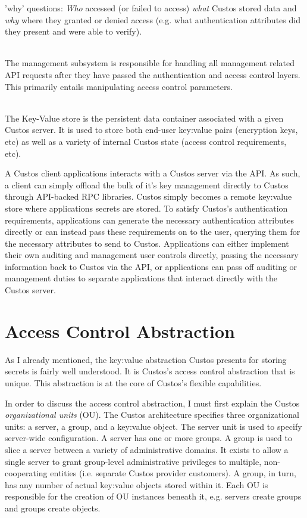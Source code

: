 \begin{packed_desc}
  'why' questions: \emph{Who} accessed (or failed to access)
  \emph{what} Custos stored data and \emph{why} where they granted or
  denied access (e.g. what authentication attributes did they present
  and were able to verify).
\item[Management Subsystem] \hfill \\ The management subsystem is
  responsible for handling all management related API requests after
  they have passed the authentication and access control layers. This
  primarily entails manipulating access control parameters.
\item[Key-Value Store] \hfill \\ The Key-Value store is the persistent
  data container associated with a given Custos server. It is used to
  store both end-user key:value pairs (encryption keys, etc) as well
  as a variety of internal Custos state (access control requirements,
  etc).
\end{packed_desc}

A Custos client applications interacts with a Custos server via the
API. As such, a client can simply offload the bulk of it's key
management directly to Custos through API-backed RPC libraries. Custos
simply becomes a remote key:value store where applications secrets are
stored. To satisfy Custos's authentication requirements, applications
can generate the necessary authentication attributes directly or can
instead pass these requirements on to the user, querying them for the
necessary attributes to send to Custos. Applications can either
implement their own auditing and management user controls directly,
passing the necessary information back to Custos via the API, or
applications can pass off auditing or management duties to separate
applications that interact directly with the Custos server.

\section{Access Control Abstraction}

As I already mentioned, the key:value abstraction Custos presents for
storing secrets is fairly well understood. It is Custos's access
control abstraction that is unique. This abstraction is at the core of
Custos's flexible capabilities.

In order to discuss the access control abstraction, I must first
explain the Custos \emph{organizational units} (OU). The Custos
architecture specifies three organizational units: a server, a group,
and a key:value object. The server unit is used to specify server-wide
configuration. A server has one or more groups. A group is used to
slice a server between a variety of administrative domains. It exists
to allow a single server to grant group-level administrative
privileges to multiple, non-cooperating entities (i.e. separate Custos
provider customers). A group, in turn, has any number of actual
key:value objects stored within it. Each OU is responsible for the
creation of OU instances beneath it, e.g. servers create groups and
groups create objects.

